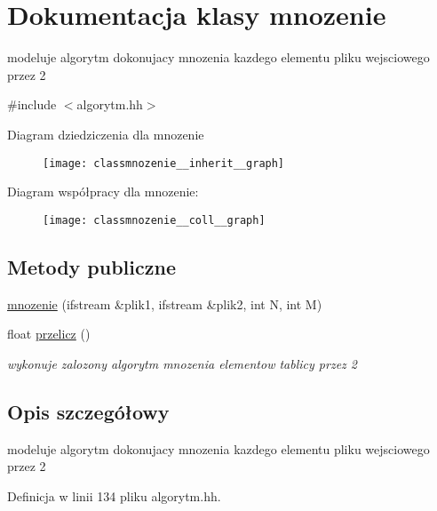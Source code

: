 \hypertarget{classmnozenie}{\section{\-Dokumentacja klasy mnozenie}
\label{classmnozenie}
}


modeluje algorytm dokonujacy mnozenia kazdego elementu pliku wejsciowego przez 2  




{\ttfamily \#include $<$algorytm.\-hh$>$}



\-Diagram dziedziczenia dla mnozenie\nopagebreak
\begin{figure}[H]
\begin{center}
\leavevmode
\texttt{[image: classmnozenie\_\_inherit\_\_graph]}
\end{center}
\end{figure}


\-Diagram współpracy dla mnozenie\-:\nopagebreak
\begin{figure}[H]
\begin{center}
\leavevmode
\texttt{[image: classmnozenie\_\_coll\_\_graph]}
\end{center}
\end{figure}
\subsection*{\-Metody publiczne}
\begin{DoxyCompactItemize}
\item 
\hyperlink{classmnozenie_a105c483d60c621dc5c1855a04e285e3c}{mnozenie} (ifstream \&plik1, ifstream \&plik2, int \-N, int \-M)
\item 
float \hyperlink{classmnozenie_a672afac7fbb6f9cdec82bca6f9e921b0}{przelicz} ()
\begin{DoxyCompactList}\small\item\em wykonuje zalozony algorytm mnozenia elementow tablicy przez 2 \end{DoxyCompactList}\end{DoxyCompactItemize}


\subsection{\-Opis szczegółowy}
modeluje algorytm dokonujacy mnozenia kazdego elementu pliku wejsciowego przez 2 

\-Definicja w linii 134 pliku algorytm.\-hh.




